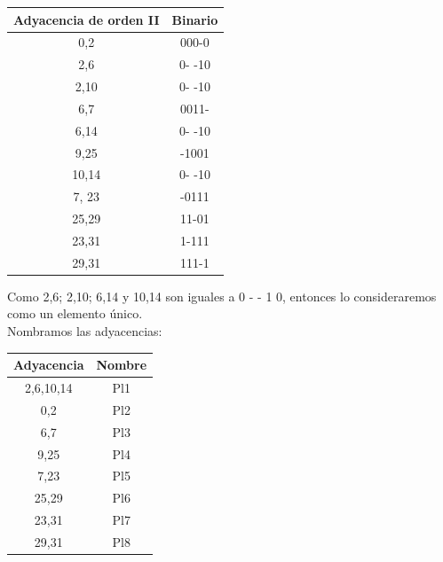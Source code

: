 \documentclass[a4paper,12pt]{article}
\begin{document}
\begin{enumerate}[label=\textcolor{teal}{\textbf{\arabic*.}}]
        \begin{center}
            \begin{tabular}{|c|c|}
                \hline
                Adyacencia de orden II & Binario\\ \hline
                0,2 & 000-0 \\ \hline 
                \rowcolor{yellow!50} 2,6 & 0- -10 \\ \hline 
                \rowcolor{cyan} 2,10 & 0- -10 \\ \hline
                6,7 & 0011- \\ \hline
                \rowcolor{cyan} 6,14 & 0- -10 \\ \hline
                9,25 & -1001 \\ \hline 
                \rowcolor{yellow!50} 10,14 & 0- -10 \\ \hline
                7, 23 & -0111 \\ \hline 
                25,29 & 11-01 \\ \hline 
                23,31 & 1-111 \\ \hline 
                29,31 & 111-1 \\ \hline 
            \end{tabular}
        \end{center}
        Como 2,6; 2,10; 6,14 y 10,14 son iguales a 0 - - 1 0, entonces lo consideraremos como un elemento único.\\
        Nombramos las adyacencias: \\

        \begin{center}
            \begin{tabular}{|c|c|}
                \hline
                Adyacencia & Nombre\\ 
                \hline
                2,6,10,14 & Pl1\\ 
                \hline 
                0,2 & Pl2 \\ 
                \hline 
                6,7 & Pl3 \\
                \hline 
                9,25 & Pl4 \\ 
                \hline 
                7,23 & Pl5 \\ 
                \hline 
                25,29 & Pl6 \\ 
                \hline 
                23,31 & Pl7 \\ 
                \hline
                29,31 & Pl8 \\ 
                \hline 
            \end{tabular}\\
        \end{center}
    

\end{enumerate}
\end{document}
